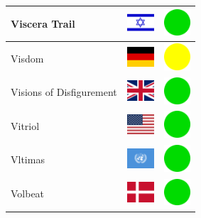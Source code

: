 \documentclass[12pt, a4paper, twoside]{report}
\begin{document}
\begin{center}
\begin{longtable}{|p{5cm}|p{2cm}|p{2cm}|}
 Viscera Trail                                              & \includegraphics[width=1cm]{../img/flags/il} &   \includegraphics[width=1cm]{../likes/y} \\ \hline
 Visdom                                                     & \includegraphics[width=1cm]{../img/flags/de} &   \includegraphics[width=1cm]{../likes/m} \\ \hline
 Visions of Disfigurement                                   & \includegraphics[width=1cm]{../img/flags/gb} &   \includegraphics[width=1cm]{../likes/y} \\ \hline
 Vitriol                                                    & \includegraphics[width=1cm]{../img/flags/us} &   \includegraphics[width=1cm]{../likes/y} \\ \hline
 Vltimas                                                    & \includegraphics[width=1cm]{../img/flags/un} &   \includegraphics[width=1cm]{../likes/y} \\ \hline
 Volbeat                                                    & \includegraphics[width=1cm]{../img/flags/dk} &   \includegraphics[width=1cm]{../likes/y} \\ \hline

\end{longtable}
\end{center}
\end{document}
